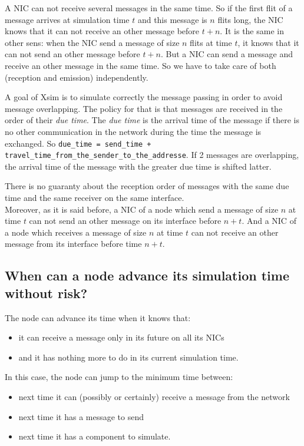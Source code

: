 A NIC can not receive
several messages in the same time. So if the first flit of a message arrives 
at simulation time $t$ and this message is $n$ flits long, the NIC knows that 
it can not receive an other message before $t+n$. 
It is the same in other sens: when the NIC send a message of size $n$ flits at time $t$,
it knows that it can not send an other message before $t+n$.
But a NIC can send a message and receive an other message in the same time. So 
we have to take care of both (reception and emission) independently.

A goal of Xsim is to simulate correctly the message passing in order to avoid
message overlapping. The policy for that is that messages are received in the order
of their \emph{due time}. The \emph{due time} is the arrival time of the message
if there is no other communication in the network during the time the message is
exchanged. So \verb|due_time = send_time + travel_time_from_the_sender_to_the_addresse|.
If 2 messages are overlapping, the arrival time of the message with the greater 
due time is shifted latter. 

There is no guaranty about the reception order of messages with the same 
due time and the same receiver on the same interface.\\

Moreover, as it is said before, a NIC of a node which send a message of size $n$ at 
time $t$ can not send an other message on its interface before $n+t$.
And a NIC of a node which receives a message of size $n$ at time
$t$ can not receive an other message from its interface before time $n+t$.


\subsection{When can a node advance its simulation time without risk?}
The node can advance its time when it knows that:
\begin{itemize}
	\item it can receive a message only in its future on all its NICs
    \item and it has nothing more to do in its current simulation time.
\end{itemize}
In this case, the node can jump to the minimum time between:
\begin{itemize}
    \item next time it can (possibly or certainly) receive a message from the network
    \item next time it has a message to send 
    \item next time it has a component to simulate.
\end{itemize}

